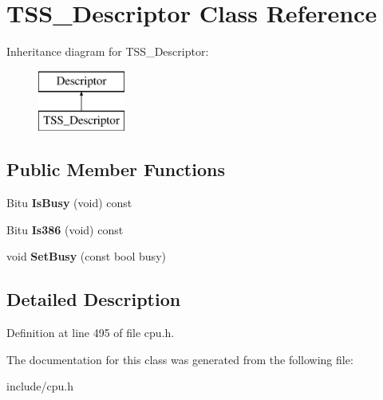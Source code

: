 \hypertarget{classTSS__Descriptor}{\section{T\-S\-S\-\_\-\-Descriptor Class Reference}
\label{classTSS__Descriptor}
}
Inheritance diagram for T\-S\-S\-\_\-\-Descriptor\-:\begin{figure}[H]
\begin{center}
\leavevmode
\includegraphics[height=2.000000cm]{classTSS__Descriptor}
\end{center}
\end{figure}
\subsection*{Public Member Functions}
\begin{DoxyCompactItemize}
\item 
\hypertarget{classTSS__Descriptor_a26dd9532a72d55eb59015058c4ee7dc2}{Bitu {\bfseries Is\-Busy} (void) const }\label{classTSS__Descriptor_a26dd9532a72d55eb59015058c4ee7dc2}

\item 
\hypertarget{classTSS__Descriptor_a3b41b696577f19ee21c4130256158ec9}{Bitu {\bfseries Is386} (void) const }\label{classTSS__Descriptor_a3b41b696577f19ee21c4130256158ec9}

\item 
\hypertarget{classTSS__Descriptor_a1fd4b23896821543c3bd7ba8ef17669f}{void {\bfseries Set\-Busy} (const bool busy)}\label{classTSS__Descriptor_a1fd4b23896821543c3bd7ba8ef17669f}

\end{DoxyCompactItemize}


\subsection{Detailed Description}


Definition at line 495 of file cpu.\-h.



The documentation for this class was generated from the following file\-:\begin{DoxyCompactItemize}
\item 
include/cpu.\-h\end{DoxyCompactItemize}
